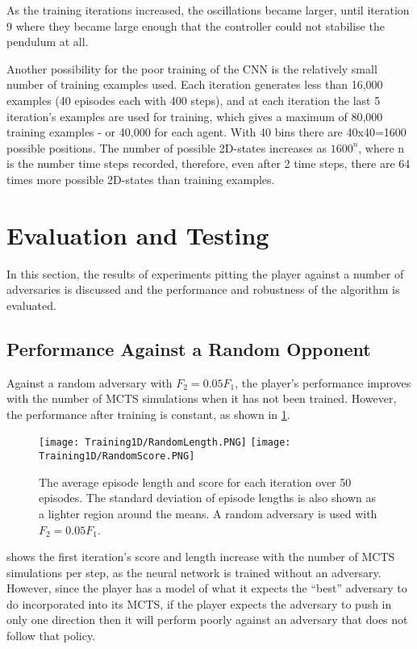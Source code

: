 \documentclass[../main.tex]{subfiles}
\begin{document}
As the training iterations increased, the oscillations became larger, until iteration 9 where they became large enough that the controller could not stabilise the pendulum at all.

Another possibility for the poor training of the CNN is the relatively small number of training examples used. Each iteration generates less than 16,000 examples (40 episodes each with 400 steps), and at each iteration the last 5 iteration's examples are used for training, which gives a maximum of 80,000 training examples - or 40,000 for each agent. With 40 bins there are 40x40=1600 possible positions. The number of possible 2D-states increases as $1600^n$, where n is the number time steps recorded, therefore, even after 2 time steps, there are 64 times more possible 2D-states than training examples.

\newpage
\section{Evaluation and Testing}

In this section, the results of experiments pitting the player against a number of adversaries is discussed and the performance and robustness of the algorithm is evaluated.

\subsection{Performance Against a Random Opponent}

Against a random adversary with $F_2 = 0.05F_1$, the player's performance improves with the number of MCTS simulations when it has not been trained. However, the performance after training is constant, as shown in \cref{fig:rand}.

\begin{figure}[H]
    \centering
    \texttt{[image: Training1D/RandomLength.PNG]}
    \texttt{[image: Training1D/RandomScore.PNG]}
    \caption{The average episode length and score for each iteration over 50 episodes. The standard deviation of episode lengths is also shown as a lighter region around the means. A random adversary is used with $F_2=0.05F_1$.}
    \label{fig:rand}
\end{figure}

 shows the first iteration's score and length increase with the number of MCTS simulations per step, as the neural network is trained without an adversary. However, since the player has a model of what it expects the ``best'' adversary to do incorporated into its MCTS, if the player expects the adversary to push in only one direction then it will perform poorly against an adversary that does not follow that policy.
\end{document}
